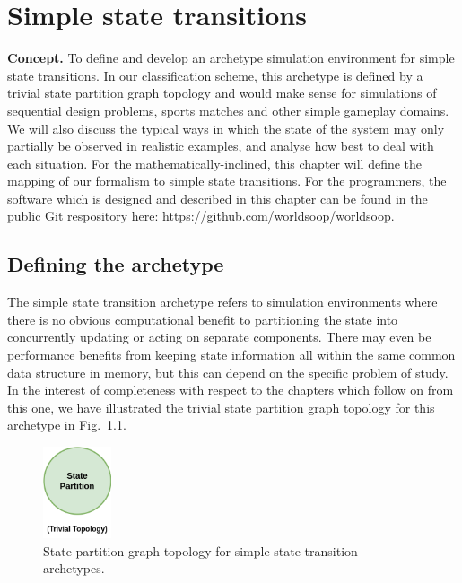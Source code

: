 \chapter{\sffamily Simple state transitions}

{\bfseries\sffamily Concept.} To define and develop an archetype simulation environment for simple state transitions. In our classification scheme, this archetype is defined by a trivial state partition graph topology and would make sense for simulations of sequential design problems, sports matches and other simple gameplay domains. We will also discuss the typical ways in which the state of the system may only partially be observed in realistic examples, and analyse how best to deal with each situation. For the mathematically-inclined, this chapter will define the mapping of our formalism to simple state transitions. For the programmers, the software which is designed and described in this chapter can be found in the public Git respository here: \href{https://github.com/worldsoop/worldsoop}{https://github.com/worldsoop/worldsoop}.


\section{\sffamily Defining the archetype}

The simple state transition archetype refers to simulation environments where there is no obvious computational benefit to partitioning the state into concurrently updating or acting on separate components. There may even be performance benefits from keeping state information all within the same common data structure in memory, but this can depend on the specific problem of study. In the interest of completeness with respect to the chapters which follow on from this one, we have illustrated the trivial state partition graph topology for this archetype in Fig.~\ref{fig:state-partition-graph-simple-state-transitions}.

\begin{figure}[h]
\centering
\includegraphics[width=2cm]{images/chapter-6-state-partition-graph.drawio.png}
\caption{State partition graph topology for simple state transition archetypes.}
\label{fig:state-partition-graph-simple-state-transitions}
\end{figure}

